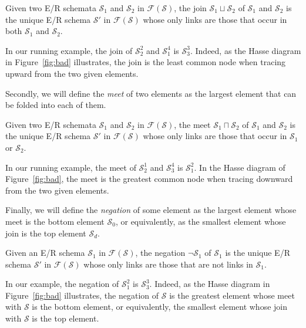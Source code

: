 \documentclass[sigconf]{acmart}
\begin{document}
\begin{definition}[join]\label{def:join}
Given two E/R schemata $\mathcal{S}_1$ and $\mathcal{S}_2$ in $\mathcal{F}(\mathcal{S})$, the join $\mathcal{S}_1\sqcup \mathcal{S}_2$ of $\mathcal{S}_1$ and $\mathcal{S}_2$ is the unique E/R schema $\mathcal{S}'$ in $\mathcal{F}(\mathcal{S})$ whose only links are those that occur in both $\mathcal{S}_1$ and $\mathcal{S}_2$.
\end{definition}

In our running example, the join of $\mathcal{S}^2_2$ and $\mathcal{S}^4_1$ is $\mathcal{S}^3_3$. Indeed, as the Hasse diagram in Figure~\ref{fig:bad} illustrates, the join is the least common node when tracing upward from the two given elements.

Secondly, we will define the \emph{meet} of two elements as the largest element that can be folded into each of them.

\begin{definition}[meet]\label{def:meet}
Given two E/R schemata $\mathcal{S}_1$ and $\mathcal{S}_2$ in $\mathcal{F}(\mathcal{S})$, the meet $\mathcal{S}_1\sqcap \mathcal{S}_2$ of $\mathcal{S}_1$ and $\mathcal{S}_2$ is the unique E/R schema $\mathcal{S}'$ in $\mathcal{F}(\mathcal{S})$ whose only links are those that occur in $\mathcal{S}_1$ or $\mathcal{S}_2$.
\end{definition}

In our running example, the meet of $\mathcal{S}^1_2$ and $\mathcal{S}^4_3$ is $\mathcal{S}^2_1$. In the Hasse diagram of Figure~\ref{fig:bad}, the meet is the greatest common node when tracing downward from the two given elements.

Finally, we will define the \emph{negation} of some element as the largest element whose meet is the bottom element $\mathcal{S}_0$, or equivalently, as the smallest element whose join is the top element $\mathcal{S}_d$.

\begin{definition}[negation]\label{def:negation}
Given an E/R schema $\mathcal{S}_1$ in $\mathcal{F}(\mathcal{S})$, the negation $\neg\mathcal{S}_1$ of $\mathcal{S}_1$ is the unique E/R schema $\mathcal{S}'$ in $\mathcal{F}(\mathcal{S})$ whose only links are those that are not links in $\mathcal{S}_1$.
\end{definition}

In our example, the negation of $\mathcal{S}^2_1$ is $\mathcal{S}^3_3$. Indeed, as the Hasse diagram in Figure~\ref{fig:bad} illustrates, the negation of $\mathcal{S}$ is the greatest element whose meet with $\mathcal{S}$ is the bottom element, or equivalently, the smallest element whose join with $\mathcal{S}$ is the top element.
\end{document}
